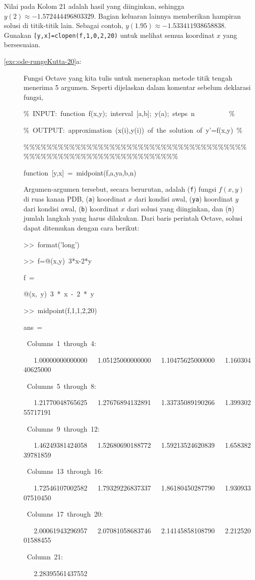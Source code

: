Nilai pada Kolom 21 adalah hasil yang diinginkan, sehingga $y(2)\approx-1.572444496803329$.
Bagian keluaran lainnya memberikan hampiran solusi di titik-titik
lain. Sebagai contoh, $y(1.95)\approx-1.533411938658838$. Gunakan
\texttt{{[}y,x{]}=clopen(f,1,0,2,20)} untuk melihat semua koordinat
$x$ yang bersesuaian.
\begin{description}
\item [{\ref{exc:ode-rungeKutta-20}a:}] Fungsi Octave yang kita tulis
untuk menerapkan metode titik tengah menerima 5 argumen. Seperti dijelaskan
dalam komentar sebelum deklarasi fungsi,

\begin{lyxcode}
\%~INPUT:~function~f(x,y);~interval~{[}a,b{]};~y(a);~steps~n~~~~~~~~~~\%

\%~OUTPUT:~approximation~(x(i),y(i))~of~the~solution~of~y'=f(x,y)~\%

\%\%\%\%\%\%\%\%\%\%\%\%\%\%\%\%\%\%\%\%\%\%\%\%\%\%\%\%\%\%\%\%\%\%\%\%\%\%\%\%\%\%\%\%\%\%\%\%\%\%\%\%\%\%\%\%\%\%\%\%\%\%\%\%\%\%

function~{[}y,x{]}~=~midpoint(f,a,ya,b,n)~
\end{lyxcode}
Argumen-argumen tersebut, secara berurutan, adalah (\texttt{f}) fungsi
$f(x,y)$ di ruas kanan PDB, (\texttt{a}) koordinat $x$ dari kondisi
awal, (\texttt{ya}) koordinat $y$ dari kondisi awal, (\texttt{b})
koordinat $x$ dari solusi yang diinginkan, dan (\texttt{n}) jumlah
langkah yang harus dilakukan. Dari baris perintah Octave, solusi dapat
ditemukan dengan cara berikut:
\begin{lyxcode}
>\textcompwordmark >~format('long')

>\textcompwordmark >~f=@(x,y)~3{*}x-2{*}y

f~=

@(x,~y)~3~{*}~x~-~2~{*}~y

>\textcompwordmark >~midpoint(f,1,1,2,20)

ans~=

~Columns~1~through~4:

~~~1.00000000000000~~~1.05125000000000~~~1.10475625000000~~~1.16030440625000

~Columns~5~through~8:

~~~1.21770048765625~~~1.27676894132891~~~1.33735089190266~~~1.39930255717191

~Columns~9~through~12:

~~~1.46249381424058~~~1.52680690188772~~~1.59213524620839~~~1.65838239781859

~Columns~13~through~16:

~~~1.72546107002582~~~1.79329226837337~~~1.86180450287790~~~1.93093307510450

~Columns~17~through~20:

~~~2.00061943296957~~~2.07081058683746~~~2.14145858108790~~~2.21252001588455

~Column~21:

~~~2.28395561437552
\end{lyxcode}
\end{description}
